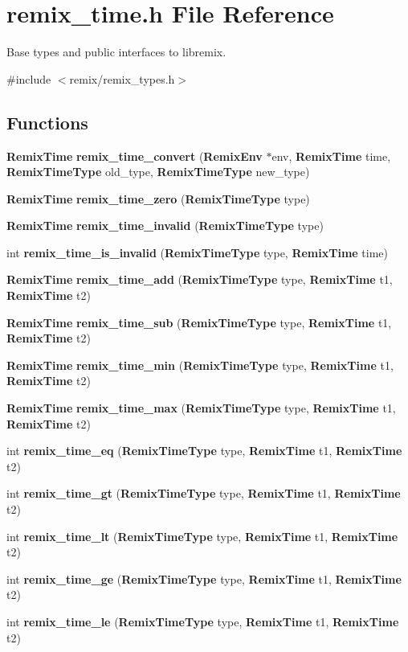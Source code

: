 \section{remix\_\-time.h File Reference}
\label{remix__time_8h}


Base types and public interfaces to libremix.  


{\ttfamily \#include $<$remix/remix\_\-types.h$>$}\par
\subsection*{Functions}
\begin{DoxyCompactItemize}
\item 
{\bf RemixTime} {\bf remix\_\-time\_\-convert} ({\bf RemixEnv} $\ast$env, {\bf RemixTime} time, {\bf RemixTimeType} old\_\-type, {\bf RemixTimeType} new\_\-type)
\item 
{\bf RemixTime} {\bf remix\_\-time\_\-zero} ({\bf RemixTimeType} type)
\item 
{\bf RemixTime} {\bf remix\_\-time\_\-invalid} ({\bf RemixTimeType} type)
\item 
int {\bf remix\_\-time\_\-is\_\-invalid} ({\bf RemixTimeType} type, {\bf RemixTime} time)
\item 
{\bf RemixTime} {\bf remix\_\-time\_\-add} ({\bf RemixTimeType} type, {\bf RemixTime} t1, {\bf RemixTime} t2)
\item 
{\bf RemixTime} {\bf remix\_\-time\_\-sub} ({\bf RemixTimeType} type, {\bf RemixTime} t1, {\bf RemixTime} t2)
\item 
{\bf RemixTime} {\bf remix\_\-time\_\-min} ({\bf RemixTimeType} type, {\bf RemixTime} t1, {\bf RemixTime} t2)
\item 
{\bf RemixTime} {\bf remix\_\-time\_\-max} ({\bf RemixTimeType} type, {\bf RemixTime} t1, {\bf RemixTime} t2)
\item 
int {\bf remix\_\-time\_\-eq} ({\bf RemixTimeType} type, {\bf RemixTime} t1, {\bf RemixTime} t2)
\item 
int {\bf remix\_\-time\_\-gt} ({\bf RemixTimeType} type, {\bf RemixTime} t1, {\bf RemixTime} t2)
\item 
int {\bf remix\_\-time\_\-lt} ({\bf RemixTimeType} type, {\bf RemixTime} t1, {\bf RemixTime} t2)
\item 
int {\bf remix\_\-time\_\-ge} ({\bf RemixTimeType} type, {\bf RemixTime} t1, {\bf RemixTime} t2)
\item 
int {\bf remix\_\-time\_\-le} ({\bf RemixTimeType} type, {\bf RemixTime} t1, {\bf RemixTime} t2)
\end{DoxyCompactItemize}


